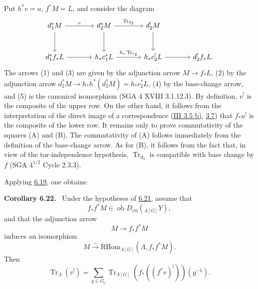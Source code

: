 \documentclass[11pt]{article}
\newenvironment{statement}[1]{\par\medskip\noindent\textbf{#1.}\ }{\par\medskip}
\providecommand{\RHom}{\mathrm{RHom}}
\providecommand{\Tr}{\operatorname{Tr}}
\providecommand{\Tr}{\operatorname{Tr}}
\providecommand{\Ob}{\operatorname{ob}}
\providecommand{\Tr}{\operatorname{Tr}}
\providecommand{\RHom}{\mathrm{RHom}}
\providecommand{\RHom}{\mathrm R\mathcal{H}om}
\providecommand{\Ob}{\operatorname{ob}}
\providecommand{\Tr}{\operatorname{Tr}}
\providecommand{\Ob}{\operatorname{Ob}}
\providecommand{\RHom}{\mathrm{RHom}}
\providecommand{\Tr}{\operatorname{Tr}}
\providecommand{\Ob}{\operatorname{ob}}
\providecommand{\Ob}{\operatorname{Ob}}
\begin{document}
Put $h^*v=u$, $f^*M=L$, and consider the diagram
\[
\begin{tikzcd}[column sep=large,row sep=large]
d_1^*M \arrow[r,"v"] \arrow[d] &
d_2^*M \arrow[r,"\Tr_{d_2}"] \arrow[d] &
d_2^!M \arrow[d] & {}\\
d_1^*f_*L \arrow[r] &
h_*c_1^*L \arrow[r,"h_*\Tr_{c_2}"] &
h_*c_2^!L \arrow[r] &
d_2^!f_*L .
\end{tikzcd}
\]
The arrows (1) and (3) are given by the adjunction arrow $M\to f_*L$, (2) by the adjunction arrow $d_2^*M\to h_*h^*(d_2^*M)=h_*c_2^*L$, (4) by the base-change arrow, and (5) is the canonical isomorphism (SGA 4 XVIII 3.1.12.3). By definition, $v^!$ is the composite of the upper row. On the other hand, it follows from the interpretation of the direct image of a correspondence (\hyperref[sga5:III:corollary:3.5]{III 3.5 b)}, \hyperref[sga5:III:subsection:3.7]{3.7}) that $f_*u^!$ is the composite of the lower row. It remains only to prove commutativity of the squares (A) and (B). The commutativity of (A) follows immediately from the definition of the base-change arrow. As for (B), it follows from the fact that, in view of the tor-independence hypothesis, $\Tr_{d_2}$ is compatible with base change by $f$ (SGA $4^{1/2}$ Cycle 2.3.3).

Applying \hyperref[sga5:IIIB:proposition:6.19]{6.19}, one obtains:

\label{sga5:IIIB:corollary:6.22}\begin{statement}{Corollary 6.22}
Under the hypotheses of \hyperref[sga5:IIIB:proposition:6.21]{6.21}, assume that
\[
f_*f^*M\in\Ob D_{\mathrm{ctf}}({}_{\Lambda[G]}Y),
\]
and that the adjunction arrow
\[
M\to f_*f^*M
\]
induces an isomorphism
\[
M\xrightarrow{\sim}\RHom_{\Lambda[G]}(\Lambda,f_*f^*M).
\]
Then
\begin{equation}
\Tr_{\Lambda}(v^!)=
\sum_{g\in G_{\natural}}\Tr_{\Lambda[G]}(f_*((f^*v)^!))(g^{-1}).
\tag{6.22.1}\label{sga5:IIIB:equation:6.22.1}
\end{equation}
\end{statement}
\end{document}
